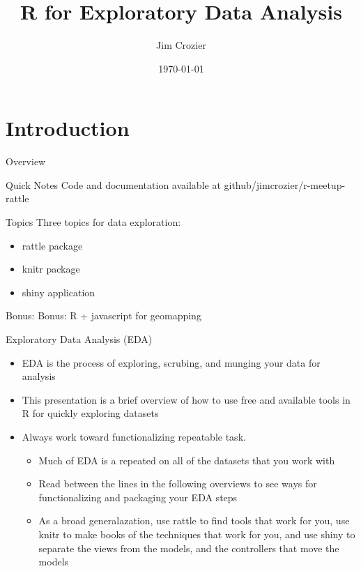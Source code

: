 \documentclass[xcolor=dvipsnames]{beamer}
\title{R for Exploratory Data Analysis}
\author{Jim Crozier}
\institute[Stratusfy LLC jim@stratusfy.com]{Stratusfy: Data Science and Cloud Technology.}
\date{\today}
\begin{document}

 
\begin{frame}
    \titlepage
\end{frame}
 
\section{Introduction}
\begin{frame}[t,allowframebreaks]{Overview}
\begin{block}{Quick Notes}
Code and documentation available at github/jimcrozier/r-meetup-rattle
\end{block}

\begin{block}{Topics}
Three topics for data exploration:
\end{block}
 
\begin{itemize}
    \item rattle package
    \item knitr package
    \item shiny application
\end{itemize}

\begin{block}{Bonus:}
Bonus: R + javascript for geomapping
\end{block}
 
 \newpage
 \begin{block}{Exploratory Data Analysis (EDA)}
\begin{itemize}
\item EDA is the process of exploring, scrubing, and munging your data for analysis
\item This presentation is a brief overview of how to use free and available tools in R for quickly exploring datasets
\item Always work toward functionalizing repeatable task. 
\begin{itemize}
\item Much of EDA is a repeated on all of the datasets that you work with
\item Read between the lines in the following overviews to see ways for functionalizing and packaging your EDA steps
\item As a broad generalazation, use rattle to find tools that work for you, use knitr to make books of the techniques that work for you, and use shiny to separate the views from the models, and the controllers that move the models
\end{itemize}
\end{itemize}
\end{block}
\end{frame}
\end{document}
